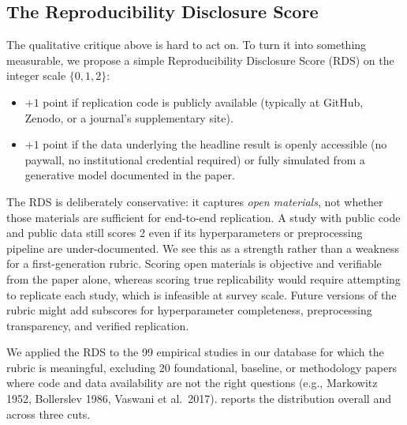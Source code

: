 \subsection{The Reproducibility Disclosure Score}\label{subsec:rds}

The qualitative critique above is hard to act on. To turn it into something measurable, we propose a simple Reproducibility Disclosure Score (RDS) on the integer scale $\{0, 1, 2\}$:

\begin{itemize}[leftmargin=*]
    \item $+1$ point if replication code is publicly available (typically at GitHub, Zenodo, or a journal's supplementary site).
    \item $+1$ point if the data underlying the headline result is openly accessible (no paywall, no institutional credential required) or fully simulated from a generative model documented in the paper.
\end{itemize}

The RDS is deliberately conservative: it captures \textit{open materials}, not whether those materials are sufficient for end-to-end replication. A study with public code and public data still scores 2 even if its hyperparameters or preprocessing pipeline are under-documented. We see this as a strength rather than a weakness for a first-generation rubric. Scoring open materials is objective and verifiable from the paper alone, whereas scoring true replicability would require attempting to replicate each study, which is infeasible at survey scale. Future versions of the rubric might add subscores for hyperparameter completeness, preprocessing transparency, and verified replication.

We applied the RDS to the 99 empirical studies in our database for which the rubric is meaningful, excluding 20 foundational, baseline, or methodology papers where code and data availability are not the right questions (e.g., Markowitz 1952, Bollerslev 1986, Vaswani et al.\ 2017).  reports the distribution overall and across three cuts.


